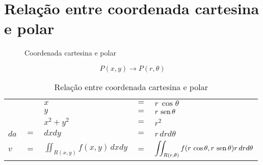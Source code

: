 \section{Relação entre coordenada cartesina e polar}
	\begin{figure}[htb]
		\caption{Coordenada cartesina e polar}
		\label{coordenada_cartesiana_polar}
		\centering		
		\quad\quad
	\end{figure}
	
	$$P(x,y) \rightarrow P(r,\theta)$$
	
	\begin{table}[htb]
		\caption{Relação entre coordenada cartesina e polar}
		\label{relacao_coordenada_cartesiana_polar}
		\centering		
		\begin{tabular}{|lclcl|}
			     &     & $x$                                 & $=$ & $r\,\cos \theta$                                                         \\
			     &     & $y$                                 & $=$ & $r\,\operatorname{sen} \theta$                                                         \\
			     &     & $x^2 + y^2$                         & $=$ & $r^2$                                                                    \\
			$da$ & $=$ & $dxdy$                              & $=$ & $r\,drd\theta$                                                           \\
			$v$  & $=$ & $\displaystyle\iint_{R(x,y)} f(x,y)\, dxdy$ & $=$ & $\displaystyle\iint_{R(r,\theta)} f(r\,\cos \theta,r\,\operatorname{sen} \theta) r\,drd\theta$
		\end{tabular}		
	\end{table}